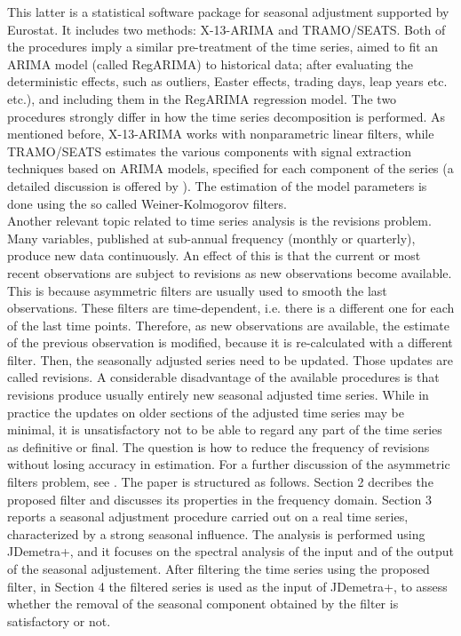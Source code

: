 \documentclass[english,blauw]{cbsdiscussionpaper}
\begin{document}
This latter is  a statistical software package for seasonal adjustment supported by Eurostat. It includes two methods: X-13-ARIMA and TRAMO/SEATS. Both of the procedures imply a similar pre-treatment of the time series, aimed to fit an ARIMA model (called RegARIMA) to historical data; after evaluating the deterministic effects, such as outliers, Easter effects, trading days, leap years etc. etc.), and including them in the RegARIMA regression model. The two procedures strongly differ in how the time series decomposition is performed. As mentioned before, X-13-ARIMA works with nonparametric linear filters, while TRAMO/SEATS estimates the various components with signal extraction techniques based on ARIMA models, specified for each component of the series (a detailed discussion is offered by \citep{mar2008}). The estimation of the model parameters is done using the so called Weiner-Kolmogorov filters.\\
Another relevant topic related to time series analysis is the revisions problem. Many variables, published at sub-annual frequency (monthly or quarterly), produce new data continuously. An effect of this is that the current or most recent observations are subject to revisions as new observations become available. This is because asymmetric filters are usually used to smooth the last observations. These filters are time-dependent, i.e. there is a different one for each of the last time points. Therefore, as new observations are available, the estimate of the previous observation is modified, because it is re-calculated with a different filter. Then, the seasonally adjusted series need to be updated. Those updates are called revisions. A considerable disadvantage of the available procedures is that revisions produce usually entirely new seasonal adjusted time series. While in practice the updates on older sections of the adjusted time series may be minimal, it is unsatisfactory not to be able to regard any part of the time series as definitive or final. The question is how to reduce the frequency of revisions without losing accuracy in estimation. For a further discussion of the asymmetric filters problem, see \citep{dageal2015}.
The paper is structured as follows. Section 2 decribes the proposed filter and discusses its properties in the frequency domain. Section 3 reports a seasonal adjustment procedure carried out on a real time series, characterized by a strong seasonal influence. The analysis is performed using JDemetra+, and it focuses on the spectral analysis of the input and  of the output of the seasonal adjustement. After filtering the time series using the proposed filter, in Section 4 the filtered series is used as the input of JDemetra+,  to assess whether the removal of the seasonal component obtained by the filter is satisfactory or not.\\
\end{document}
